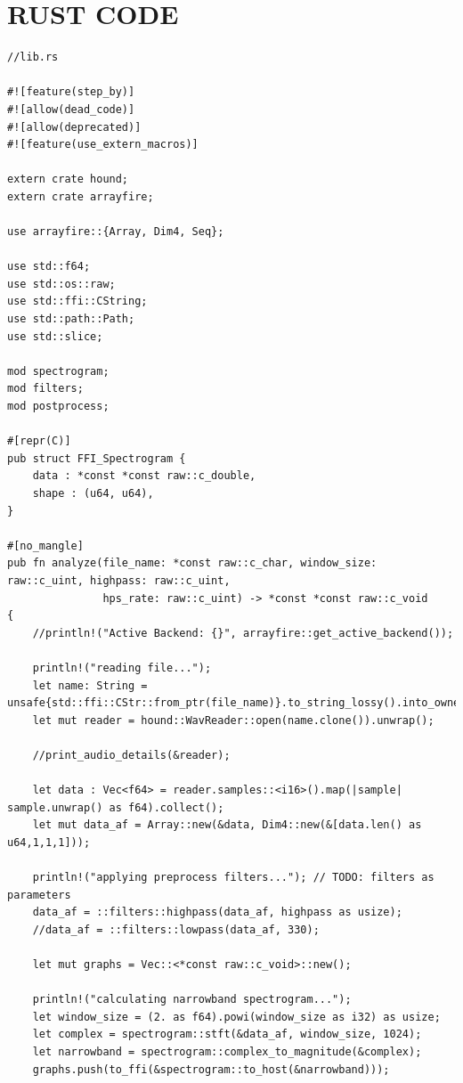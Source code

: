 \documentclass[a4paper,12pt]{report}
\begin{document}
\printbibliography

\appendix
\chapter{RUST CODE}

\fontsize{8}{8}\selectfont
\begin{verbatim}
//lib.rs

#![feature(step_by)]
#![allow(dead_code)]
#![allow(deprecated)]
#![feature(use_extern_macros)]

extern crate hound;
extern crate arrayfire;

use arrayfire::{Array, Dim4, Seq};

use std::f64;
use std::os::raw;
use std::ffi::CString;
use std::path::Path;
use std::slice;

mod spectrogram;
mod filters;
mod postprocess;

#[repr(C)]
pub struct FFI_Spectrogram {
    data : *const *const raw::c_double,
    shape : (u64, u64),
}

#[no_mangle]
pub fn analyze(file_name: *const raw::c_char, window_size: raw::c_uint, highpass: raw::c_uint, 
               hps_rate: raw::c_uint) -> *const *const raw::c_void
{
    //println!("Active Backend: {}", arrayfire::get_active_backend());
    
    println!("reading file...");
    let name: String = unsafe{std::ffi::CStr::from_ptr(file_name)}.to_string_lossy().into_owned();
    let mut reader = hound::WavReader::open(name.clone()).unwrap();

    //print_audio_details(&reader);

    let data : Vec<f64> = reader.samples::<i16>().map(|sample| sample.unwrap() as f64).collect();
    let mut data_af = Array::new(&data, Dim4::new(&[data.len() as u64,1,1,1])); 
  
    println!("applying preprocess filters..."); // TODO: filters as parameters
    data_af = ::filters::highpass(data_af, highpass as usize);
    //data_af = ::filters::lowpass(data_af, 330);

    let mut graphs = Vec::<*const raw::c_void>::new();        

    println!("calculating narrowband spectrogram...");
    let window_size = (2. as f64).powi(window_size as i32) as usize;
    let complex = spectrogram::stft(&data_af, window_size, 1024);
    let narrowband = spectrogram::complex_to_magnitude(&complex);
    graphs.push(to_ffi(&spectrogram::to_host(&narrowband)));
    

\end{verbatim}
\end{document}
